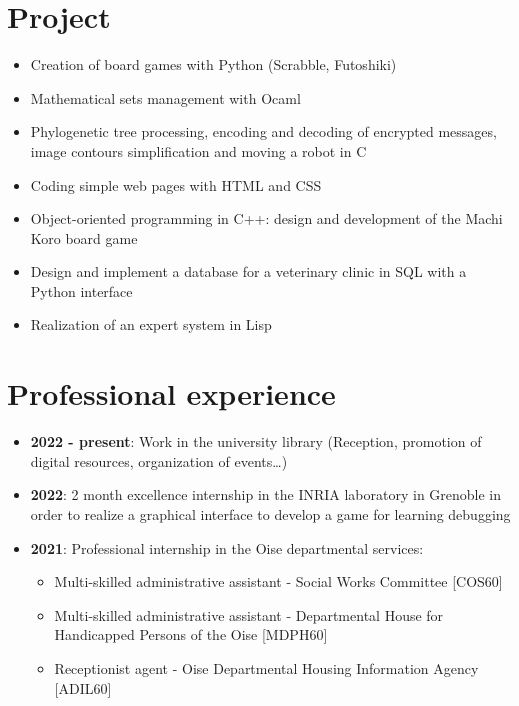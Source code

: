 \documentclass[9pt, oneside, a4paper, titlepage]{extarticle}
\begin{document}
\begin{tcolorbox}
\begin{minipage}[t]{12.8cm}
\begin{tcolorbox}[grow to right by = 0.6cm, colback = gray!25, colframe = white]
                \section*{Project}
                \begin{itemize}
                    \item Creation of board games with Python (Scrabble, Futoshiki)
                    \item Mathematical sets management with Ocaml
                    \item Phylogenetic tree processing, encoding and decoding of 
                    encrypted messages, image contours simplification and moving 
                    a robot in C
                    \item Coding simple web pages with HTML and CSS
                    \item Object-oriented programming in C++: design and development of the Machi Koro board game
                    \item Design and implement a database for a veterinary clinic in SQL with a Python interface
                    \item Realization of an expert system in Lisp
                \end{itemize}
                
                \section*{Professional experience}
                \begin{itemize}
                    \item \textbf{2022 - present}: Work in the university library (Reception, promotion of digital resources, organization of events\dots)
                    \item \textbf{2022}: 2 month excellence internship in the INRIA 
                    laboratory in Grenoble in order to realize a 
                    graphical interface to develop a game for learning
                    debugging
                    \item \textbf{2021}: Professional internship in the Oise departmental services:
                    \begin{itemize}  
                        \item Multi-skilled administrative assistant -  Social Works Committee [COS60]
                        \item Multi-skilled administrative assistant - Departmental House for Handicapped Persons of the Oise [MDPH60]
                        \item Receptionist agent - Oise Departmental Housing Information Agency [ADIL60]
                    \end{itemize}
                

\end{itemize}
\end{tcolorbox}
\end{minipage}
\end{tcolorbox}
\end{document}
